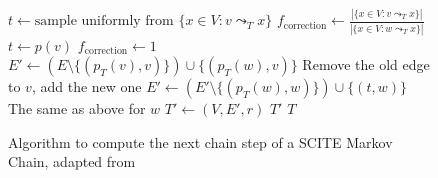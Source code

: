 \begin{figure}
\begin{algorithmic}
                \EndIf
                    \State $t \leftarrow \text{sample uniformly from } \{x \in V: v \leadsto_T x\}$
                    \State $f_\mathrm{correction} \leftarrow \frac{|\{x \in V : v \leadsto_T x\}|}{|\{x \in V : w \leadsto_T x\}|}$
                \Else
                    \State $t \leftarrow p(v)$
                    \State $f_\mathrm{correction} \leftarrow 1$
                \EndIf
                \State $E' \leftarrow (E \setminus \{(p_T(v), v)\}) \cup \{(p_T(w), v)\}$ \Comment Remove the old edge to $v$, add the new one
                \State $E' \leftarrow (E' \setminus \{(p_T(w), w)\}) \cup \{(t, w)\}$ \Comment The same as above for $w$
            \EndIf
            \State $T' \leftarrow (V, E', r)$
                \State \Return $T'$
            \Else
                \State \Return $T$
            \EndIf
        \EndFunction
    \end{algorithmic}
    \caption{Algorithm to compute the next chain step of a SCITE Markov Chain, adapted from \cite{tree2016}}
    \label{alg:scite-step}
\end{figure}
